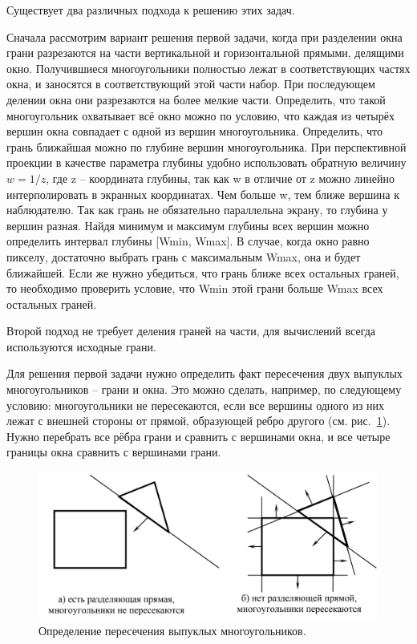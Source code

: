 Существует два различных подхода к решению этих задач.

Сначала рассмотрим вариант решения первой задачи, когда при разделении окна
грани разрезаются на части вертикальной и горизонтальной прямыми, делящими окно. Получившиеся многоугольники полностью лежат в соответствующих частях окна, и заносятся в соответствующий этой части набор.
При последующем делении окна они разрезаются на более мелкие части.
Определить, что такой многоугольник охватывает всё окно можно по условию, что каждая из четырёх вершин окна совпадает с одной из вершин
многоугольника. Определить, что грань ближайшая можно по глубине
вершин многоугольника. При перспективной проекции в качестве параметра глубины удобно использовать обратную величину \(w = 1/z\), где z – координата глубины, так как w в отличие от z можно линейно интерполировать в экранных координатах. Чем больше w, тем ближе вершина к наблюдателю. Так как грань не обязательно параллельна экрану, то глубина у
вершин разная. Найдя минимум и максимум глубины всех вершин можно
определить интервал глубины [Wmin, Wmax]. В случае, когда окно равно
пикселу, достаточно выбрать грань с максимальным Wmax, она и будет
ближайшей. Если же нужно убедиться, что грань ближе всех остальных
граней, то необходимо проверить условие, что Wmin этой грани больше
Wmax всех остальных граней.

Второй подход не требует деления граней на части, для вычислений
всегда используются исходные грани.

Для решения первой задачи нужно определить факт пересечения
двух выпуклых многоугольников – грани и окна. Это можно сделать, например, по следующему условию: многоугольники не пересекаются, если
все вершины одного из них лежат с внешней стороны от прямой, образующей ребро другого (см. рис.~\ref{fig:varnak_algorithm_2}). Нужно перебрать все рёбра грани и сравнить с вершинами окна, и все четыре границы окна сравнить с вершинами грани.

\begin{figure}[H]
    \centering
    \includegraphics[width=\textwidth]{img/varnak_algorithm_2.png}
    \caption{Определение пересечения выпуклых многоугольников.}
    \label{fig:varnak_algorithm_2}
\end{figure}

